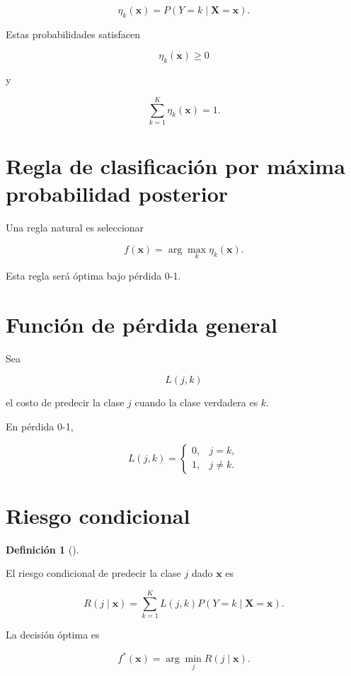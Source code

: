 \documentclass[
  spanish,
  11pt,
  letterpaper,
  DIV=11,
  numbers=noendperiod]{scrreprt}
\theoremstyle{definition}
\newtheorem{definition}{Definición}[chapter]
\theoremstyle{plain}
\theoremstyle{definition}
\theoremstyle{remark}
\begin{document}
\[
\eta_k(\mathbf{x})
=
P(Y=k\mid\mathbf{X}=\mathbf{x}).
\]

Estas probabilidades satisfacen

\[
\eta_k(\mathbf{x})\geq 0
\]

y

\[
\sum_{k=1}^{K}
\eta_k(\mathbf{x})
=
1.
\]

\section{Regla de clasificación por máxima probabilidad
posterior}\label{regla-de-clasificaciuxf3n-por-muxe1xima-probabilidad-posterior}

Una regla natural es seleccionar

\[
f(\mathbf{x})
=
\arg\max_{k}
\eta_k(\mathbf{x}).
\]

Esta regla será óptima bajo pérdida 0-1.

\section{Función de pérdida
general}\label{funciuxf3n-de-puxe9rdida-general}

Sea

\[
L(j,k)
\]

el costo de predecir la clase \(j\) cuando la clase verdadera es \(k\).

En pérdida 0-1,

\[
L(j,k)
=
\begin{cases}
0, & j=k,\\
1, & j\neq k.
\end{cases}
\]

\section{Riesgo condicional}\label{riesgo-condicional}

\begin{definition}[]\protect\hypertarget{def-riesgo-condicional}{}\label{def-riesgo-condicional}

El riesgo condicional de predecir la clase \(j\) dado \(\mathbf{x}\) es

\[
R(j\mid\mathbf{x})
=
\sum_{k=1}^{K}
L(j,k)
P(Y=k\mid\mathbf{X}=\mathbf{x}).
\]

\end{definition}

La decisión óptima es

\[
f^{*}(\mathbf{x})
=
\arg\min_j
R(j\mid\mathbf{x}).
\]
\end{document}
